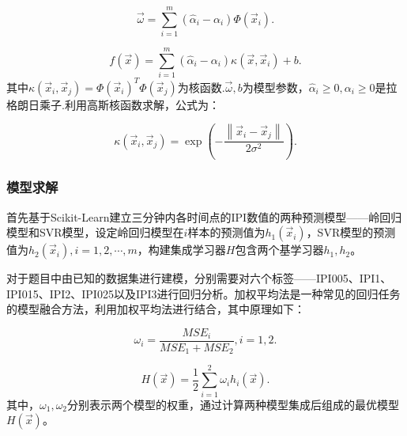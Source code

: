 \begin{enumerate}
    \begin{equation}
        \overrightarrow{\omega }=\sum\limits_{i=1}^{m}{\left( {{\widehat{\alpha }}_{i}}-{{\alpha }_{i}} \right)\Phi \left( {{\overrightarrow{x}}_{i}} \right)}.
    \end{equation}
        
    \begin{equation}
        f\left( \overrightarrow{x} \right)=\sum\limits_{i=1}^{m}{\left( {{\widehat{\alpha }}_{i}}-{{\alpha }_{i}} \right)\kappa \left( \overrightarrow{x},{{\overrightarrow{x}}_{i}} \right)}+b.
    \end{equation}
    其中$\kappa \left( {{\overrightarrow{x}}_{i}},{{\overrightarrow{x}}_{j}} \right)=\Phi {{\left( {{\overrightarrow{x}}_{i}} \right)}^{T}}\Phi \left( {{\overrightarrow{x}}_{j}} \right)$为核函数.$\overrightarrow{\omega },b$为模型参数，${{\widehat{\alpha }}_{i}}\ge 0,{{\alpha }_{i}}\ge 0$是拉格朗日乘子.利用高斯核函数求解，公式为：
    
    \begin{equation}
        \kappa \left( {{\overrightarrow{x}}_{i}},{{\overrightarrow{x}}_{j}} \right)=\exp \left( -\frac{\left\| {{\overrightarrow{x}}_{i}}-{{\overrightarrow{x}}_{j}} \right\|}{2{{\sigma }^{2}}} \right).
    \end{equation}

\end{enumerate}





\subsubsection{模型求解}

首先基于Scikit-Learn建立三分钟内各时间点的IPI数值的两种预测模型——岭回归模型和SVR模型，设定岭回归模型在$i$样本的预测值为${{h}_{1}}({{\overrightarrow{x}}_{i}})$，SVR模型的预测值为${{h}_{2}}({{\overrightarrow{x}}_{i}}),i=1,2,\cdots ,m$，构建集成学习器$H$包含两个基学习器{${{h}_{1}},{{h}_{2}}$}。


对于题目中由已知的数据集进行建模，分别需要对六个标签——IPI005、IPI1、IPI015、IPI2、IPI025以及IPI3进行回归分析。加权平均法是一种常见的回归任务的模型融合方法，利用加权平均法进行结合，其中原理如下：

\begin{equation}
    {{\omega }_{i}}=\frac{MS{{E}_{i}}}{MS{{E}_{1}}+MS{{E}_{2}}},i=1,2.
\end{equation}


\begin{equation}
    H(\overrightarrow{x})=\frac{1}{2}\sum\limits_{i=1}^{2}{{{\omega }_{i}}{{h}_{i}}(\overrightarrow{x})}.
\end{equation}
其中，${{\omega }_{1}},{{\omega }_{2}}$分别表示两个模型的权重，通过计算两种模型集成后组成的最优模型$H(\overrightarrow{x})$。

